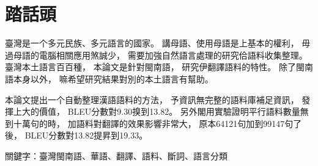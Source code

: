 \chapter{踏話頭}
臺灣是一个多元民族、多元語言的國家。
講母語、使用母語是上基本的權利，
毋過母語的電腦相關應用煞誠少，
需要加強自然語言處理的研究佮語料收集整理。
臺灣本土語言百百種，
本論文是針對閩南語，
研究伊翻譯語料的特性。
除了閩南語本身以外，
嘛希望研究結果對別的本土語言有幫助。

本論文提出一个自動整理漢語語料的方法，
予資訊無完整的語料庫補足資訊，
發揮上大的價值，
BLEU分數對9.30搝到13.82。
另外閣用實驗證明平行語料數量無到十萬句的時，
加語料對翻譯的效果影響非常大，
原本64121句加到99147句了後，
BLEU分數對13.82提昇到19.33。

關鍵字：臺灣閩南語、華語、翻譯、語料、斷詞、語言分類
